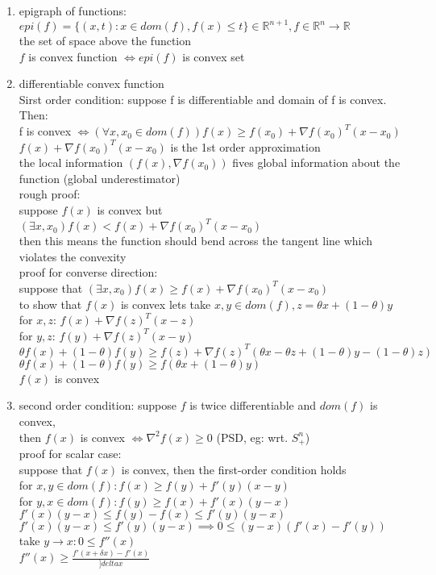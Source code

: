 \documentclass[12pt,letter]{article}
\newcommand{\R}{\mathbb{R}}
\newcommand{\set}[1]{\{#1\}}
\begin{document}
\begin{enumerate}
\item epigraph of functions: $epi(f)=\set{(x,t): x \in dom(f), f(x) \leq t} \in \R^{n+1}, f \in \R^n \to \R$\\
  the set of space above the function\\
  $f$ is convex function $\iff epi(f)$ is convex set\\
\item differentiable convex function\\
  Sirst order condition:  suppose f is differentiable and domain of f is convex. Then:\\
  f is convex $\iff (\forall x,x_0 \in dom(f)) f(x) \geq f(x_0) + \nabla f(x_0)^T(x-x_0)$\\
  $f(x) + \nabla f(x_0)^T(x-x_0)$ is the 1st order approximation\\
  the local information $(f(x),\nabla f(x_0))$ fives global information about the function (global underestimator)\\

  rough proof:\\
  suppose $f(x)$ is convex but $(\exists x, x_0) f(x) < f(x) + \nabla f(x_0)^T(x-x_0)$\\
  then this means the function should bend across the tangent line which violates the convexity\\
  
  proof for converse direction:\\
  suppose that $(\exists x, x_0) f(x) \geq f(x) + \nabla f(x_0)^T(x-x_0)$\\
  to show that $f(x)$ is convex lets take $x,y \in dom(f), z= \theta x + (1-\theta)y$\\
  for $x,z$: $f(x) + \nabla f(z)^T(x-z)$\\
  for $y,z$: $f(y) + \nabla f(z)^T(x-y)$\\
  $\theta f(x) + (1-\theta) f(y) \geq f(z) + \nabla f(z)^T(\theta x - \theta z + (1-\theta)y - (1-\theta)z)$\\
  $\theta f(x) + (1-\theta) f(y) \geq f(\theta x +(1-\theta)y)$\\
  $f(x)$ is convex
\item second order condition: suppose $f$ is twice differentiable and $dom(f)$ is convex, \\
  then $f(x)$ is convex $\iff \nabla^2 f(x) \geq 0 $ (PSD, eg: wrt. $S_+^n$)\\
  
  proof for scalar case:\\
  suppose that $f(x)$ is convex, then the first-order condition holds\\
  for $x,y \in dom(f): f(x) \geq f(y) + f'(y)(x-y)$\\
  for $y,x \in dom(f): f(y) \geq f(x) + f'(x)(y-x)$\\
  $f'(x)(y-x) \leq f(y)-f(x) \leq f'(y)(y-x)$\\
  $f'(x)(y-x) \leq f'(y)(y-x) \implies 0 \leq (y-x)(f'(x)-f'(y))$\\
  take $y\to x: 0 \leq f''(x)$\\
  $f''(x) \geq \frac{f'(x+\delta x)-f'(x)}{]delta x}$\\


\end{enumerate}
\end{document}
